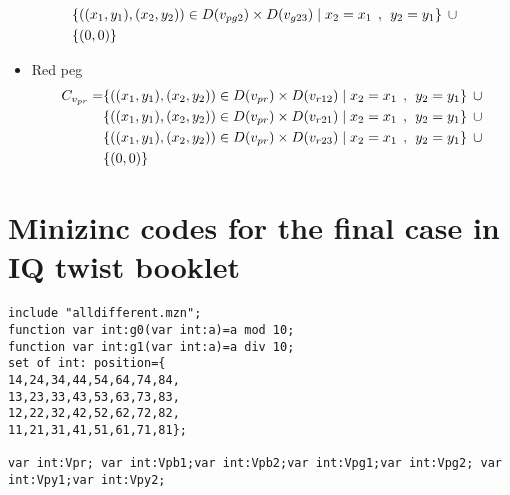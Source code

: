 \begin{appendices}
\begin{itemize}
\begin{align*}
\\&\{ ((x_{1},y_{1}),(x_{2},y_{2}))\in D(v_{pg2}) \times D(v_{g23})\mid x_{2} = x_{1} \hspace{1ex} , \hspace{1ex}  y_{2} = y_{1}\} \hspace{1ex} \cup 
\\&\{(0,0)\}
\end{align*}
  \item Red peg
  \begin{align*}
C_{v_{pr}} = &\{((x_{1},y_{1}),(x_{2},y_{2}))\in D(v_{pr}) \times D(v_{r12})\mid x_{2} = x_{1} \hspace{1ex} , \hspace{1ex}  y_{2} = y_{1}\} \hspace{1ex} \cup 
\\&\{((x_{1},y_{1}),(x_{2},y_{2}))\in D(v_{pr}) \times D(v_{r21})\mid x_{2} = x_{1} \hspace{1ex} , \hspace{1ex}  y_{2} = y_{1}\} \hspace{1ex} \cup 
\\&\{ ((x_{1},y_{1}),(x_{2},y_{2}))\in D(v_{pr}) \times D(v_{r23})\mid x_{2} = x_{1} \hspace{1ex} , \hspace{1ex}  y_{2} = y_{1}\}\hspace{1ex} \cup 
\\& \{(0,0)\}
\end{align*}
\end{itemize}
\section{Minizinc codes for the final case in IQ twist booklet}
\label{appendix:finalcaseIQtwist}
\begin{lstlisting}[language=minizinc]
include "alldifferent.mzn";
function var int:g0(var int:a)=a mod 10;
function var int:g1(var int:a)=a div 10;
set of int: position={
14,24,34,44,54,64,74,84,
13,23,33,43,53,63,73,83,
12,22,32,42,52,62,72,82,
11,21,31,41,51,61,71,81};

var int:Vpr; var int:Vpb1;var int:Vpb2;var int:Vpg1;var int:Vpg2; var int:Vpy1;var int:Vpy2;


\end{lstlisting}
\end{appendices}
